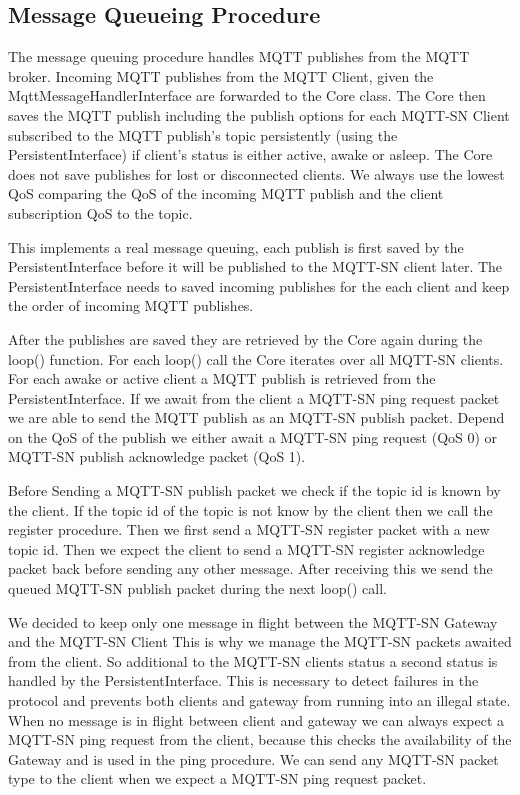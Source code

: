 \subsection{Message Queueing Procedure}\label{sec:messagequeueingprocedure}
The message queuing procedure handles MQTT publishes from the MQTT broker.
Incoming MQTT publishes from the MQTT Client, given the MqttMessageHandlerInterface are forwarded to the Core class.
The Core then saves the MQTT publish including the publish options for each MQTT-SN Client subscribed to the MQTT publish's topic persistently (using the PersistentInterface) if client's status is either active, awake or asleep.
The Core does not save publishes for lost or disconnected clients.
We always use the lowest QoS comparing the QoS of the incoming MQTT publish and the client subscription QoS to the topic.

This implements a real message queuing, each publish is first saved by the PersistentInterface before it will be published to the MQTT-SN client later.
The PersistentInterface needs to saved incoming publishes for the each client and keep the order of incoming MQTT publishes.

After the publishes are saved they are retrieved by the Core again during the loop() function.
For each loop() call the Core iterates over all MQTT-SN clients.
For each awake or active client a MQTT publish is retrieved from the PersistentInterface.
If we await from the client a MQTT-SN ping request packet we are able to send the MQTT publish as an MQTT-SN publish packet.
Depend on the QoS of the publish we either await a MQTT-SN ping request (QoS 0) or MQTT-SN publish acknowledge packet (QoS 1).

Before Sending a MQTT-SN publish packet we check if the topic id is known by the client.
If the topic id of the topic is not know by the client then we call the register procedure.
Then we first send a MQTT-SN register packet with a new topic id.
Then we expect the client to send a MQTT-SN register acknowledge packet back before sending any other message.
After receiving this we send the queued MQTT-SN publish packet during the next loop() call.

We decided to keep only one message in flight between the MQTT-SN Gateway and the MQTT-SN Client
This is why we manage the MQTT-SN packets awaited from the client.
So additional to the MQTT-SN clients status a second status is handled by the PersistentInterface.
This is necessary to detect failures in the protocol and prevents both clients and gateway from running into an illegal state.
When no message is in flight between client and gateway we can always expect a MQTT-SN ping request from the client, because this checks the availability of the Gateway and is used in the ping procedure.
We can send any MQTT-SN packet type to the client when we expect a MQTT-SN ping request packet.

